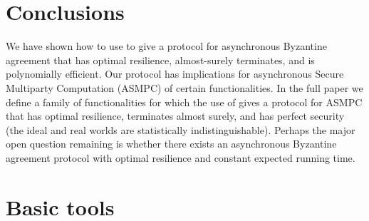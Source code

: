 \documentclass{sig-alternate}
\newcommand{\davss}{{\text{SVSS}}\xspace}
\begin{document}
\section{Conclusions}


We have shown how to use \davss to give a protocol for asynchronous
Byzantine agreement that has optimal resilience, almost-surely
terminates, and is polynomially efficient.
Our \davss protocol has implications for asynchronous Secure Multiparty
Computation  (ASMPC) of certain functionalities. In the full paper we
define a family of functionalities for which the use of \davss gives a
protocol for
ASMPC that has optimal resilience, terminates almost surely, and has
perfect security (the ideal and real worlds are statistically
indistinguishable).
Perhaps the major open question remaining is whether there exists
an asynchronous Byzantine agreement protocol with optimal resilience and
constant expected running time.





\appendix



\section{Basic tools}
\end{document}
